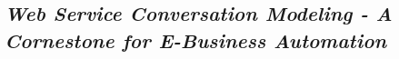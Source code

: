 \subsection{\textit{Web Service Conversation Modeling - A Cornestone for E-Business Automation} \cite{benatallah2004web}}



